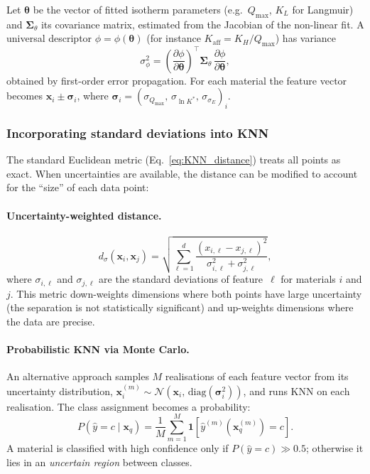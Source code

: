 	Let $\boldsymbol{\theta}$ be the vector of fitted isotherm
	parameters (e.g.\ $Q_{\max}$, $K_L$ for Langmuir) and
	$\boldsymbol{\Sigma}_{\theta}$ its covariance matrix, estimated
	from the Jacobian of the non-linear fit.  A universal descriptor
	$\phi = \phi(\boldsymbol{\theta})$ (for instance
	$K_{\mathrm{aff}} = K_H / Q_{\max}$) has variance
	\begin{equation}
		\sigma_\phi^2
		= \left(\frac{\partial\phi}{\partial\boldsymbol{\theta}}
		\right)^{\!\top}
		\boldsymbol{\Sigma}_{\theta}\,
		\frac{\partial\phi}{\partial\boldsymbol{\theta}},
		\label{eq:error_prop}
	\end{equation}
	obtained by first-order error propagation.  For each material
	the feature vector becomes
	$\mathbf{x}_i \pm \boldsymbol{\sigma}_i$, where
	$\boldsymbol{\sigma}_i
	= (\sigma_{Q_{\max}},\, \sigma_{\ln K^{\ast}},\,
	\sigma_{\sigma_E})_i$.

	\subsubsection{Incorporating standard deviations into KNN}

	The standard Euclidean metric
	(Eq.~\eqref{eq:KNN_distance}) treats all points as exact.
	When uncertainties are available, the distance can be
	modified to account for the ``size'' of each data point:

	\paragraph{Uncertainty-weighted distance.}
	\begin{equation}
		d_{\sigma}(\mathbf{x}_i, \mathbf{x}_j)
		= \sqrt{\sum_{\ell=1}^{d}
			\frac{(x_{i,\ell} - x_{j,\ell})^2}
			{\sigma_{i,\ell}^2 + \sigma_{j,\ell}^2}},
		\label{eq:KNN_sigma_distance}
	\end{equation}
	where $\sigma_{i,\ell}$ and $\sigma_{j,\ell}$ are the standard
	deviations of feature~$\ell$ for materials $i$ and $j$.
	This metric down-weights dimensions where both points have
	large uncertainty (the separation is not statistically
	significant) and up-weights dimensions where the data are
	precise.

	\paragraph{Probabilistic KNN via Monte Carlo.}
	An alternative approach samples $M$ realisations of each
	feature vector from its uncertainty distribution,
	$\mathbf{x}_i^{(m)} \sim \mathcal{N}(\mathbf{x}_i,\,
	\mathrm{diag}(\boldsymbol{\sigma}_i^2))$,
	and runs KNN on each realisation.  The class assignment
	becomes a probability:
	\begin{equation}
		P(\hat{y} = c \mid \mathbf{x}_q)
		= \frac{1}{M}\sum_{m=1}^{M}
		\mathbf{1}\!\left[
			\hat{y}^{(m)}(\mathbf{x}_q^{(m)}) = c
			\right].
		\label{eq:KNN_MC}
	\end{equation}
	A material is classified with high confidence only if
	$P(\hat{y} = c) \gg 0.5$; otherwise it lies in an
	\emph{uncertain region} between classes.

